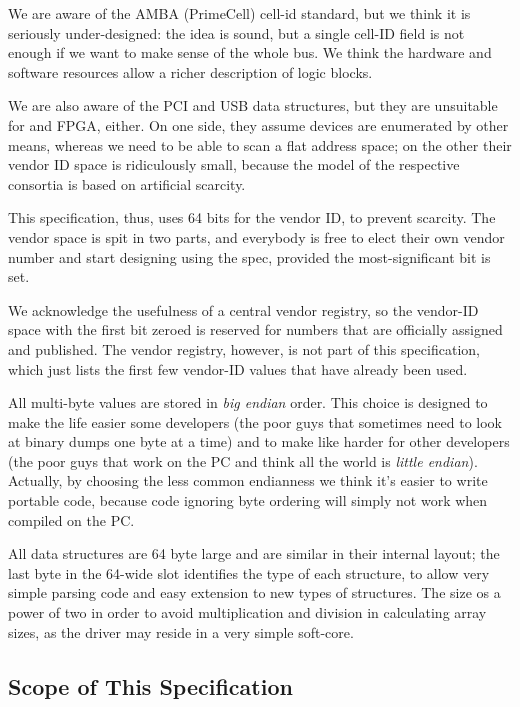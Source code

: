 \documentclass[a4paper, 12pt]{article}
\begin{document}
We are aware of the AMBA (PrimeCell) cell-id standard, but we think it
is seriously under-designed: the idea is sound, but a single cell-ID field
is not enough if we want to make sense of the whole bus. We think the
hardware and software resources allow a richer description of logic blocks.

We are also aware of the PCI and USB data structures, but they are
unsuitable for and FPGA, either. On one side, they assume devices are
enumerated by other means, whereas we need to be able to scan a flat
address space; on the other their vendor ID space is ridiculously small,
because the model of the respective consortia is based on artificial scarcity.

This specification, thus, uses 64 bits for the vendor ID, to prevent scarcity.
The vendor space is spit in two parts, and everybody is free to elect their
own vendor number and start designing using the spec, provided the most-significant
bit is set.

We acknowledge the usefulness of a central vendor registry, so the
vendor-ID space with the first bit zeroed is reserved for numbers that
are officially assigned and published.  The vendor registry, however, is not
part of this specification, which just lists the first few vendor-ID values that
have already been used.

All multi-byte values are stored in \textit{big endian} order.  This
choice is designed to make the life easier some developers (the poor
guys that sometimes need to look at binary dumps one byte at a time)
and to make like harder for other developers (the poor guys that work
on the PC and think all the world is \textit{little endian}).  Actually,
by choosing the less common endianness we think it's easier to write
portable code, because code ignoring byte ordering will simply not work
when compiled on the PC.

All data structures are 64 byte large and are similar in their
internal layout; the last byte in the 64-wide slot identifies the type
of each structure, to allow very simple parsing code and easy extension
to new types of structures.  The size os a power of two in order to
avoid multiplication and division in calculating array sizes, as the
driver may reside in a very simple soft-core.


\subsection{Scope of This Specification}
\end{document}
